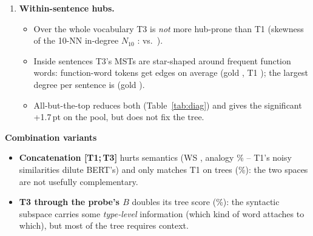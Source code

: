 \documentclass[11pt,a4paper]{article}
\newcommand{\pt}{\,pt}
\newcommand{\blk}[1]{\par\needspace{5\baselineskip}\smallskip\noindent\textbf{#1}\par\nobreak\vspace{1pt}}
\begin{document}
\begin{enumerate}
\begin{itemize}
\end{itemize}
\item \textbf{Within-sentence hubs.}
\begin{itemize}
\item Over the whole vocabulary T3 is \emph{not} more hub-prone than T1 (skewness of the 10-NN in-degree $N_{10}$ \citep{radovanovic}:
\SkewTThree{} vs.\ \SkewTOne).
\item Inside sentences T3's MSTs are star-shaped around frequent function words: function-word tokens get \FnDegTThree{} edges on
average (gold \FnDegGold, T1 \FnDegTOne); the largest degree per sentence is \MaxDegTThree{} (gold \MaxDegGold).
\item All-but-the-top reduces both (Table~\ref{tab:diag}) and gives the significant +1.7\pt{} on the pool, but does not fix the tree.
\end{itemize}
\end{enumerate}

\blk{Combination variants}
\begin{itemize}
\item \textbf{Concatenation [T1;\,T3]} hurts semantics (WS \ConcatWS, analogy \ConcatAN\% -- T1's noisy similarities dilute BERT's) and only
matches T1 on trees (\LadConcatPool\%): the two spaces are not usefully complementary.
\item \textbf{T3 through the probe's $B$} doubles its tree score (\LadProjPool\%): the syntactic subspace carries some \emph{type-level}
information (which kind of word attaches to which), but most of the tree requires context.
\end{itemize}
\end{document}
